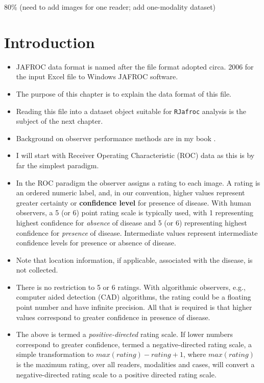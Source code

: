 \documentclass[
]{book}
\providecommand{\tightlist}{%
  \setlength{\itemsep}{0pt}\setlength{\parskip}{0pt}}
\begin{document}
80\% (need to add images for one reader; add one-modality dataset)

\hypertarget{quick-start-data-format-intro}{%
\section{Introduction}\label{quick-start-data-format-intro}}

\begin{itemize}
\tightlist
\item
  JAFROC data format is named after the file format adopted circa. 2006 for the input Excel file to Windows JAFROC software.
\item
  The purpose of this chapter is to explain the data format of this file.
\item
  Reading this file into a dataset object suitable for \texttt{RJafroc} analysis is the subject of the next chapter.
\item
  Background on observer performance methods are in my book \citep{chakraborty2017observer}.
\item
  I will start with Receiver Operating Characteristic (ROC) data \citep{metz1978rocmethodology} as this is by far the simplest paradigm.
\item
  In the ROC paradigm the observer assigns a rating to each image. A rating is an ordered numeric label, and, in our convention, higher values represent greater certainty or \textbf{confidence level} for presence of disease. With human observers, a 5 (or 6) point rating scale is typically used, with 1 representing highest confidence for \emph{absence} of disease and 5 (or 6) representing highest confidence for \emph{presence} of disease. Intermediate values represent intermediate confidence levels for presence or absence of disease.
\item
  Note that location information, if applicable, associated with the disease, is not collected.
\item
  There is no restriction to 5 or 6 ratings. With algorithmic observers, e.g., computer aided detection (CAD) algorithms, the rating could be a floating point number and have infinite precision. All that is required is that higher values correspond to greater confidence in presence of disease.
\item
  The above is termed a \emph{positive-directed} rating scale. If lower numbers correspond to greater confidence, termed a negative-directed rating scale, a simple transformation to \(max(rating) - rating + 1\), where \(max(rating)\) is the maximum rating, over all readers, modalities and cases, will convert a negative-directed rating scale to a positive directed rating scale.
\end{itemize}
\end{document}
